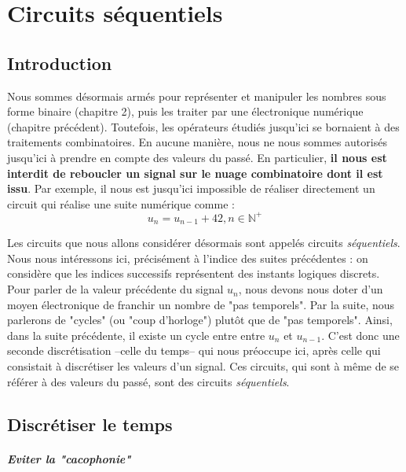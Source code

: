 \chapter{Circuits séquentiels}

\minitoc
\section{Introduction}
Nous sommes désormais armés pour représenter et manipuler les nombres sous forme binaire (chapitre 2), puis les traiter par une électronique numérique (chapitre précédent).
Toutefois, les opérateurs étudiés jusqu'ici se bornaient à des traitements combinatoires. En aucune manière, nous ne nous sommes autorisés jusqu'ici à prendre
en compte des valeurs du passé. En particulier, {\bf il nous est interdit de reboucler un signal sur le nuage combinatoire dont il est issu}.
Par exemple, il nous est jusqu'ici impossible de réaliser directement un circuit qui réalise une suite numérique comme : $$u_{n}=u_{n-1}+42,n \in  \mathbb{N}^+$$

Les circuits que nous allons considérer désormais sont appelés circuits {\it séquentiels}.
Nous nous intéressons ici, précisément à l'indice des suites précédentes : on considère que les indices successifs représentent des instants logiques discrets.
Pour parler de la valeur précédente du signal $u_n$, nous devons nous doter d'un moyen électronique de franchir un nombre de "pas temporels".
Par la suite, nous parlerons de "cycles" (ou "coup d'horloge") plutôt que de "pas temporels".
Ainsi, dans la suite précédente, il existe un cycle entre entre $u_n$ et $u_{n-1}$. C'est donc une seconde discrétisation --celle du temps-- qui nous préoccupe ici, après celle qui consistait à discrétiser les valeurs d'un signal.
Ces circuits, qui sont à même de se référer à des valeurs du passé, sont des circuits {\it séquentiels}.

\section{Discrétiser le temps}

\paragraph{Eviter la "cacophonie"}


